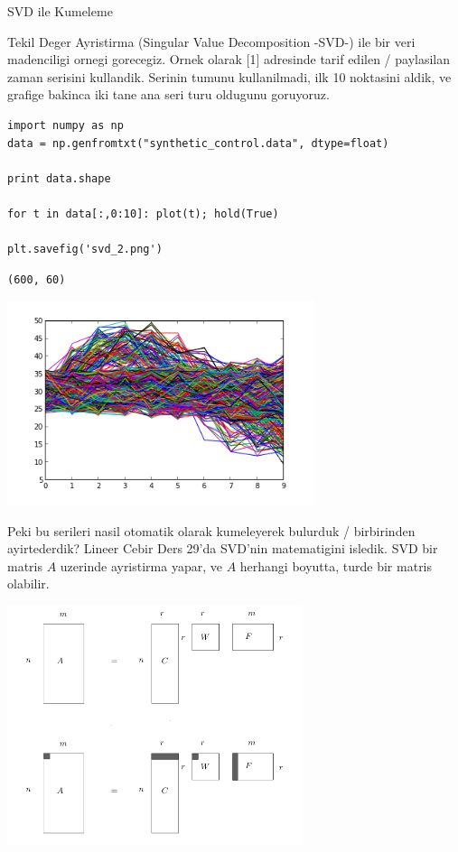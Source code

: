 \documentclass[12pt,fleqn]{article}\usepackage{../common}
\begin{document}
SVD ile Kumeleme

Tekil Deger Ayristirma (Singular Value Decomposition -SVD-) ile bir veri
madenciligi ornegi gorecegiz. Ornek olarak [1] adresinde tarif edilen /
paylasilan zaman serisini kullandik. Serinin tumunu kullanilmadi, ilk 10
noktasini aldik, ve grafige bakinca iki tane ana seri turu oldugunu
goruyoruz.

\begin{verbatim}
import numpy as np
data = np.genfromtxt("synthetic_control.data", dtype=float)

print data.shape

for t in data[:,0:10]: plot(t); hold(True)

plt.savefig('svd_2.png')
\end{verbatim}

\begin{verbatim}
(600, 60)
\end{verbatim}

\includegraphics[height=6cm]{svd_2.png}

Peki bu serileri nasil otomatik olarak kumeleyerek bulurduk / birbirinden
ayirtederdik?  Lineer Cebir Ders 29'da SVD'nin matematigini
isledik. SVD bir matris $A$ uzerinde ayristirma yapar, ve $A$ herhangi
boyutta, turde bir matris olabilir.

\includegraphics[height=7cm]{svd_1.png}
\end{document}
